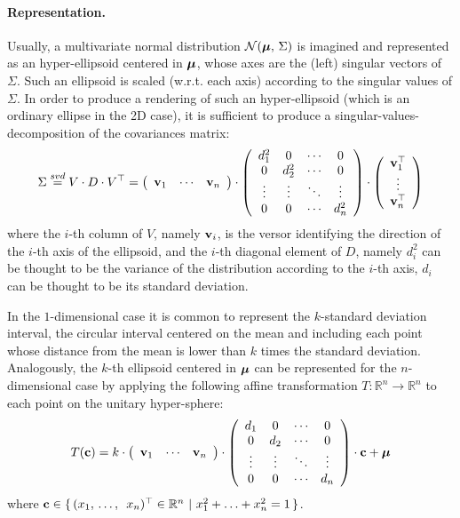 	\paragraph{Representation.}
		Usually, a multivariate normal distribution $\mathcal{N}(\boldsymbol{\mathrm{{\mu}}},\, \Sigma)$ is imagined and represented as an hyper-ellipsoid centered in $\boldsymbol{\mathrm{{\mu}}}$, whose axes are the (left) singular vectors of $\Sigma$. Such an ellipsoid is scaled (w.r.t. each axis) according to the singular values of $\Sigma$.
		In order to produce a rendering of such an hyper-ellipsoid (which is an ordinary ellipse in the 2D case), it is sufficient to produce a singular-values-decomposition of the covariances matrix:
		\[
			\Sigma \stackrel{svd}{=} V \cdot D \cdot V^\top = 
			\left(\begin{array}{ccc}
				\boldsymbol{\mathrm{{v}}}_1 & \cdots & \boldsymbol{\mathrm{{v}}}_n
			\end{array}\right)
			\cdot
			\left(\begin{array}{cccc}
				d_1^2 & 0 & \cdots & 0 \\
				0 & d_2^2 & \cdots & 0 \\
				\vdots & \vdots & \ddots & \vdots \\
				0 & 0 & \cdots & d_n^2
			\end{array}\right)
			\cdot
			\left(\begin{array}{c}
				\boldsymbol{\mathrm{{v}}}_1^\top \\
				\vdots \\
				\boldsymbol{\mathrm{{v}}}_n^\top
			\end{array}\right)
		\]
		where the $i$-th column of $V$, namely $\boldsymbol{\mathrm{{v}}}_i$, is the versor identifying the direction of the $i$-th axis of the ellipsoid, and the $i$-th diagonal element of $D$, namely $d_i^2$ can be thought to be the variance of the distribution according to the $i$-th axis, \ie{} $d_i$ can be thought to be its standard deviation.
		
		In the $1$-dimensional case it is common to represent the $k$-standard deviation interval, \ie{} the circular interval centered on the mean and including each point whose distance from the mean is lower than $k$ times the standard deviation. Analogously, the $k$-th ellipsoid centered in $\boldsymbol{\mathrm{{\mu}}}$ can be represented for the $n$-dimensional case by applying the following affine transformation $T : \mathbb{R}^n \rightarrow \mathbb{R}^n$ to each point on the unitary hyper-sphere:
		\[
			T(\boldsymbol{\mathrm{{c}}}) = k \cdot 
			\left(\begin{array}{ccc}
				\boldsymbol{\mathrm{{v}}}_1 & \cdots & \boldsymbol{\mathrm{{v}}}_n
			\end{array}\right)
			\cdot
			\left(\begin{array}{cccc}
				d_1 & 0 & \cdots & 0 \\
				0 & d_2 & \cdots & 0 \\
				\vdots & \vdots & \ddots & \vdots \\
				0 & 0 & \cdots & d_n
			\end{array}\right)
			\cdot
			\boldsymbol{\mathrm{{c}}} + \boldsymbol{\mathrm{{\mu}}}
		\]
		where $\boldsymbol{\mathrm{{c}}} \in \{\, (x_1,\, \ldots,\,\ x_n)^\top \in \mathbb{R}^n \ |\  x_1^2 + \ldots + x_n^2 = 1 \,\}$.
		
